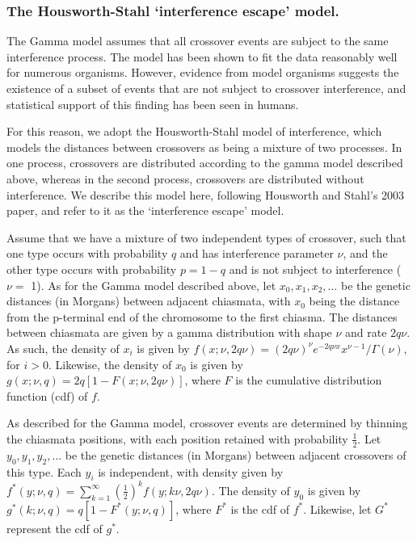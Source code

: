 \subsubsection{The Housworth-Stahl `interference escape' model.} %
 
The Gamma model assumes that all crossover events are subject to the same
interference process. The model has been shown to fit the data reasonably well for
numerous organisms\cite{Broman2000,Broman2002}. However, evidence from model organisms 
suggests the existence of a subset of events that are not subject to crossover interference\cite{Baudat2007},
and statistical support of this finding has been seen in humans\cite{Fledel-Alon2009,Housworth2003}.  

For this reason, we adopt the Housworth-Stahl model of interference, which models 
the distances between crossovers as being a mixture of two processes. In one process, 
crossovers are distributed according to the gamma model described above, whereas in the
second process, crossovers are distributed without interference. We describe this model here,
following Housworth and Stahl's 2003 paper\cite{Housworth2003}, and refer to it as the 
`interference escape' model.  

Assume that we have a mixture of two independent types of crossover, such that one type 
occurs with probability $q$ and has interference parameter $\nu$, and the other type occurs
with probability $p = 1 - q$ and is not subject to interference ($\nu =$ 1). 
As for the Gamma model described above, let $x_0,x_1,x_2,\dots$ be the genetic distances
(in Morgans) between adjacent chiasmata, with $x_0$ being the distance from the p-terminal
end of the chromosome to the first chiasma. The distances between chiasmata are given
by a gamma distribution with shape $\nu$  and rate $2 q \nu$. As such, the density of
$x_i$ is given by $f(x;\nu,2 q \nu) = (2 q \nu)^\nu e^{-2 q \nu x} x^{\nu-1} / \Gamma(\nu)$,
for $i > 0$. Likewise,
the density of $x_0$ is given by $g(x;\nu,q) = 2q [ 1 - F(x;\nu,2q\nu) ]$, where $F$ is the
cumulative distribution function (cdf) of $f$.  

As described for the Gamma model, crossover events are determined by thinning 
the chiasmata positions, with each position retained with probability $\frac{1}{2}$.
Let $y_0,y_1,y_2,\dots$ be the genetic distances (in Morgans) between adjacent crossovers
of this type. Each $y_i$ is independent, with density given by
$f^*(y;\nu,q) = \sum_{k=1}^\infty (\frac{1}{2})^k f(y;k\nu,2q\nu)$.
The density of $y_0$ is given by $g^*(k;\nu,q) = q [ 1 - F^*(y;\nu,q)]$, where $F^*$ is the cdf of $f^*$.
Likewise, let $G^*$ represent the cdf of $g^*$.  

